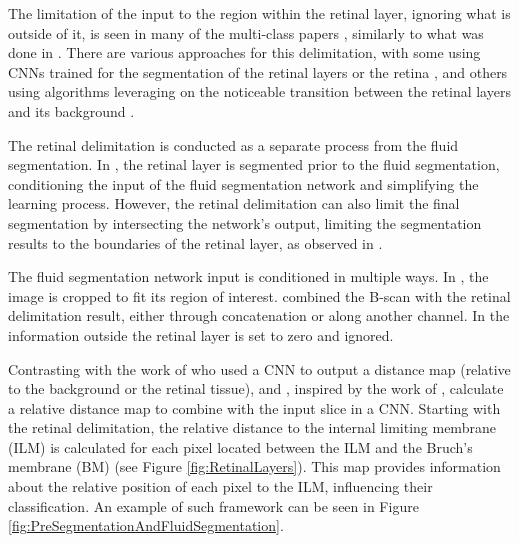 \par
The limitation of the input to the region within the retinal layer, ignoring what is outside of it, is seen in many of the multi-class papers \parencite{Hassan2021b, Hassan2021a, Lu2019, Mantel2021, Rahil2023, Tang2022, Xing2022}, similarly to what was done in \textcite{Pawan2021}. There are various approaches for this delimitation, with some using CNNs trained for the segmentation of the retinal layers or the retina \parencite{Mantel2021, Tang2022}, and others using algorithms leveraging on the noticeable transition between the retinal layers and its background \parencite{Hassan2021b, Hassan2021a, Lu2019, Rahil2023, Xing2022, Pawan2021}. 
\par
The retinal delimitation is conducted as a separate process from the fluid segmentation. In \parencite{Tang2022, Hassan2021b, Hassan2021a, Lu2019, Rahil2023, Xing2022}, the retinal layer is segmented prior to the fluid segmentation, conditioning the input of the fluid segmentation network and simplifying the learning process. However, the retinal delimitation can also limit the final segmentation by intersecting the network's output, limiting the segmentation results to the boundaries of the retinal layer, as observed in \textcite{Mantel2021}.
\par
The fluid segmentation network input is conditioned in multiple ways. In \textcite{Xing2022}, the image is cropped to fit its region of interest. \parencite{Rahil2023, Tang2022, Lu2019} combined the B-scan with the retinal delimitation result, either through concatenation or along another channel. In \parencite{Hassan2021b, Hassan2021a, Pawan2021} the information outside the retinal layer is set to zero and ignored. 
\par
Contrasting with the work of \textcite{Liu2021} who used a CNN to output a distance map (relative to the background or the retinal tissue), \textcite{Tang2022} and \textcite{Rahil2023}, inspired by the work of \textcite{Lu2019}, calculate a relative distance map to combine with the input slice in a CNN. Starting with the retinal delimitation, the relative distance to the internal limiting membrane (ILM) is calculated for each pixel located between the ILM and the Bruch's membrane (BM) (see Figure \ref{fig:RetinalLayers}). This map provides information about the relative position of each pixel to the ILM, influencing their classification. An example of such framework can be seen in Figure \ref{fig:PreSegmentationAndFluidSegmentation}.
\par
